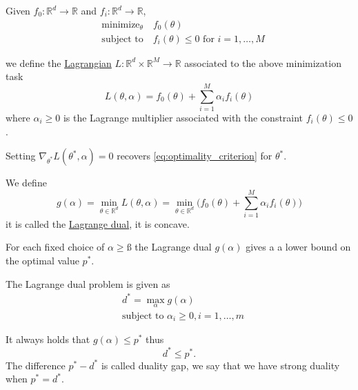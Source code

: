 \documentclass[12 pt]{article}        	%
\begin{document}
\begin{defi}
    Given $ f_0 \colon \mathbb{ R }^d \to \mathbb{ R } $ and $ f_i \colon \mathbb{ R }^d \to \mathbb{ R } $,
    \begin{align*}
        &\text{minimize}_{\theta} \quad f_0 ( \theta )
        \\
        &\text{subject to} \quad f_i ( \theta ) \leq 0 \text{ for } i =  1 , \dotsc , M 
    \end{align*}

    we define the \underline{Lagrangian} $ L \colon \mathbb{ R }^d \times \mathbb{ R }^M \to \mathbb{ R } $ associated to the above minimization task 
    \[
        L ( \theta , \alpha ) 
        = 
        f_0 ( \theta ) 
        + 
        \sum_{ i = 1 }^M \alpha_i f_i ( \theta ) 
    \]
    where $ \alpha_i \geq 0 $ is the Lagrange multiplier associated with the constraint $ f_i ( \theta ) \leq 0 $.
\end{defi}

\begin{rmk}
    Setting $\nabla_{ \theta^* } L ( \theta^* , \alpha ) = 0 $ recovers \eqref{eq:optimality_criterion} for $ \theta^*$.
\end{rmk}

\begin{defi}
    We define 
    \begin{equation*}
        g ( \alpha ) 
        = 
        \min_{ \theta \in \mathbb{ R }^d } L ( \theta , \alpha ) 
        =
        \min_{ \theta \in \mathbb{ R }^d } \bigg( f_0 ( \theta ) + \sum_{ i = 1 }^M \alpha_i f_i ( \theta ) \bigg) 
    \end{equation*}
    it is called the \underline{Lagrange dual}, it is concave.
\end{defi}

For each fixed choice of $ \alpha \geq ß $ the Lagrange dual $ g ( \alpha ) $ gives a a lower bound on the optimal value $ p^* $.

\begin{defi}
    The Lagrange dual problem is given as 
    \begin{align*}
        &d^* 
        = 
        \max_{ \alpha } g ( \alpha ) 
        \\
        &\text{subject to } \alpha_i \geq 0 , i = 1 , \dotsc , m 
    \end{align*}
    
\end{defi}

It always holds that $ g ( \alpha ) \leq p^* $ thus 
\[
    d^* \leq p^*.
\]
The difference $ p^* - d^* $ is called duality gap, we say that we have strong duality when $ p^* = d^* $.
\end{document}
